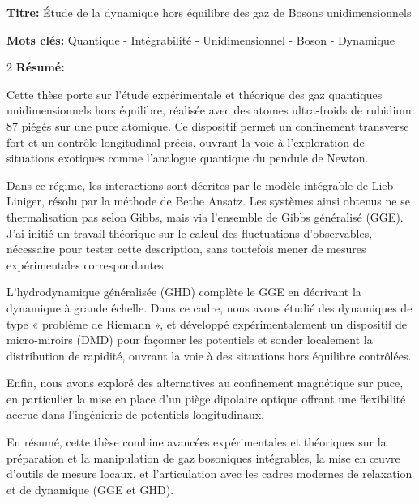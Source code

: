 \documentclass[french,12pt,a4paper]{book}
\begin{document}
\begin{mdframed}[linecolor=Prune,linewidth=1]

\textbf{Titre:} Étude de la dynamique hors équilibre des gaz de Bosons unidimensionnels

\noindent \textbf{Mots clés:} Quantique - Intégrabilité - Unidimensionnel - Boson - Dynamique

\vspace{-.5cm}
\begin{multicols}{2}
\noindent \textbf{Résumé:} {\fontsize{11pt}{6pt}\selectfont 
Cette thèse porte sur l’étude expérimentale et théorique des gaz quantiques unidimensionnels hors équilibre, réalisée avec des atomes ultra-froids de rubidium 87 piégés sur une puce atomique. Ce dispositif permet un confinement transverse fort et un contrôle longitudinal précis, ouvrant la voie à l’exploration de situations exotiques comme l’analogue quantique du pendule de Newton.

\medskip

Dans ce régime, les interactions sont décrites par le modèle intégrable de Lieb-Liniger, résolu par la méthode de Bethe Ansatz. Les systèmes ainsi obtenus ne se thermalisation pas selon Gibbs, mais via l’ensemble de Gibbs généralisé (GGE). J’ai initié un travail théorique sur le calcul des fluctuations d’observables, nécessaire pour tester cette description, sans toutefois mener de mesures expérimentales correspondantes.

\medskip

L’hydrodynamique généralisée (GHD) complète le GGE en décrivant la dynamique à grande échelle. Dans ce cadre, nous avons étudié des dynamiques de type « problème de Riemann », et développé expérimentalement un dispositif de micro-miroirs (DMD) pour façonner les potentiels et sonder localement la distribution de rapidité, ouvrant la voie à des situations hors équilibre contrôlées.

\medskip

Enfin, nous avons exploré des alternatives au confinement magnétique sur puce, en particulier la mise en place d’un piège dipolaire optique offrant une flexibilité accrue dans l’ingénierie de potentiels longitudinaux.

\medskip

En résumé, cette thèse combine avancées expérimentales et théoriques sur la préparation et la manipulation de gaz bosoniques intégrables, la mise en œuvre d’outils de mesure locaux, et l’articulation avec les cadres modernes de relaxation et de dynamique (GGE et GHD).

}
\end{multicols}
\end{mdframed}
\end{document}
